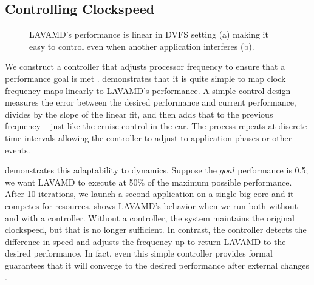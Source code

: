 \subsection{Controlling Clockspeed}
\begin{figure}
  \subfloat[]
  {
    
    \label{fig:lavamd_control}
  }
 \label{fig:freq-control}
 \caption{LAVAMD's performance is linear in DVFS setting (a) making it
   easy to control even when another application interferes (b).}
\end{figure}

We construct a controller that adjusts processor frequency to ensure
that a performance goal is met \cite{lefurgy2008power}.
 demonstrates that it is quite simple to map
clock frequency maps linearly to LAVAMD's performance.  A simple
control design measures the error between the desired performance and
current performance, divides by the slope of the linear fit, and then
adds that to the previous frequency -- just like the cruise control in
the car. The process repeats at discrete time intervals allowing the
controller to adjust to application phases or other events.

 demonstrates this adaptability to
dynamics.  Suppose the $goal$ performance is 0.5; \ie{} we want LAVAMD
to execute at 50\% of the maximum possible performance. After 10
iterations, we launch a second application on a single big core and it
competes for resources.   shows LAVAMD's
behavior when we run both without and with a controller.  Without a
controller, the system maintains the original clockspeed, but that is
no longer sufficient.  In contrast, the controller detects the
difference in speed and adjusts the frequency up to return LAVAMD to
the desired performance.  In fact, even this simple controller
provides formal guarantees that it will converge to the desired
performance after external changes \cite{Hellerstein2004a}.

